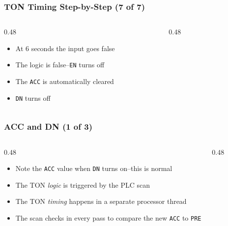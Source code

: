 \begin{frame}
    \frametitle{TON Timing Step-by-Step (7 of 7)}

    \begin{columns}
        \begin{column}{0.48\linewidth}
            \begin{itemize}
                \item At 6 seconds the input goes false
                \item The logic is false--\texttt{EN} turns off
                \item The \texttt{ACC} is automatically cleared
                \item \texttt{DN} turns off
            \end{itemize}
        \end{column}
        \begin{column}{0.48\linewidth}
            \begin{figure}
                \centering
                \resizebox{\columnwidth}{!}{
                    
                }
            \end{figure}  
        \end{column}
    \end{columns}
\end{frame}

\begin{frame}
    \frametitle{ACC and DN (1 of 3)}

    \begin{columns}
        \begin{column}{0.48\linewidth}
            \begin{itemize}
                \item Note the \texttt{ACC} value when \texttt{DN} turns on--this is normal
                \item The TON \emph{logic} is triggered by the PLC scan
                \item The TON \emph{timing} happens in a separate processor thread
                \item The scan checks in every pass to compare the new \texttt{ACC} to \texttt{PRE}
            \end{itemize}    
        \end{column}        
        \begin{column}{0.48\linewidth}
            \begin{figure}
                \centering
                \resizebox{\columnwidth}{!}{
                    
                }
            \end{figure}
        \end{column}
    \end{columns}
\end{frame}

